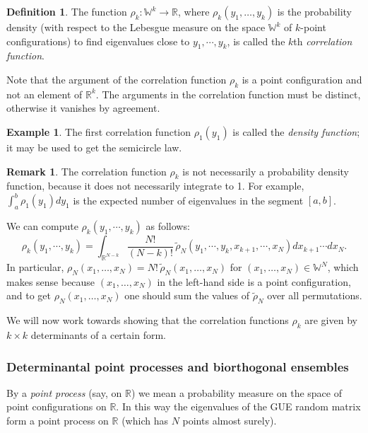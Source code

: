 \documentclass[letterpaper,11pt,oneside,reqno]{amsart}
\numberwithin{equation}{section}
\theoremstyle{definition}
\newtheorem{definition}[proposition]{Definition}
\newtheorem{remark}[proposition]{Remark}
\newtheorem{example}[proposition]{Example}
\begin{document}
\begin{definition}
  The function $\rho_k:\mathbb{W}^k\to \mathbb{R}$, 
  where $\rho_k(y_1,\dots, y_k)$ is the probability density (with respect to the Lebesgue measure on 
  the space $\mathbb{W}^{k}$ of $k$-point configurations)
  to find eigenvalues close to $y_1,\cdots, y_k$, 
  is called the $k$th \emph{correlation function}.

  Note that the argument of the correlation function $\rho_k$ 
  is a point configuration and not an element of $\mathbb{R}^{k}$.
  The arguments in the correlation function must be distinct, otherwise
  it vanishes by agreement.
\end{definition}
\begin{example}
  The first correlation function
  $\rho_1(y_1)$ is called the \emph{density function}; it may be used to get the semicircle law.
\end{example}
\begin{remark}
	The correlation function $\rho_k$
	is not necessarily a probability density function, because it does not necessarily integrate to 1.
	For example, 
	$\int_{a}^{b}\rho_{1}(y_1)dy_1$ is the expected number of eigenvalues
	in the segment $[a,b]$.
\end{remark}


We can compute $\rho_k(y_1,\cdots, y_k)$ as follows:
\begin{equation*}
  \rho_k(y_1,\cdots, y_k)=\int_{\mathbb{R}^{N-k}} \frac{N!}{(N-k)!} 
  \,\tilde \rho_N(y_1,\cdots, y_k, x_{k+1}, \cdots, x_N) dx_{k+1}\cdots dx_N.
\end{equation*}
In particular, $\rho_N(x_1,\ldots,x_N)=N!\, \tilde \rho_N(x_1,\ldots,x_N)$
for $(x_1,\ldots,x_N)\in\mathbb{W}^{N}$, which makes sense
because $(x_1,\ldots,x_N)$ in the left-hand side is a point configuration, and 
to get $\rho_N(x_1,\ldots,x_N)$ one should sum the values of $\tilde \rho_N$
over all permutations.

We will now work towards showing that the correlation functions 
$\rho_k$ are given by $k\times k$ determinants of a certain form.


\subsubsection{Determinantal point processes and biorthogonal ensembles} %
\label{ssub:determinantal_point_processes}

By a \emph{point process} (say, on $\mathbb{R}$) we mean a probability measure on the 
space of point configurations on $\mathbb{R}$. In this
way the eigenvalues of the GUE random matrix form a point process on $\mathbb{R}$
(which has $N$ points almost surely).
\end{document}

